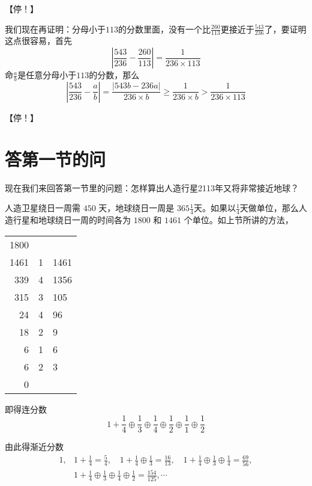 \documentclass{ctexart}
\newcommand{\cplus}{\oplus}
\begin{document}
【停！】

我们现在再证明：分母小于$113$的分数里面，没有一个比$\frac{260}{113}$更接近于$\frac{543}{236}$了，要证明这点很容易，首先
\begin{equation*}
\left|\frac{543}{236} - \frac{260}{113}\right| = \frac{1}{236\times113}
\end{equation*}
命$\frac{a}{b}$是任意分母小于$113$的分数，那么
\begin{equation*}
\left|\frac{543}{236} - \frac{a}{b}\right| = \frac{|543b - 236a|}{236\times b} \ge \frac{1}{236\times b} > \frac{1}{236\times113}
\end{equation*}

【停！】

\section{答第一节的问}
现在我们来回答第一节里的问题：怎样算出人造行星2113年又将非常接近地球？

人造卫星绕日一周需 $450$ 天，地球绕日一周是 $365 \frac{1}{4}$天。如果以$\frac{1}{4}$天做单位，那么人造行星和地球绕日一周的时间各为 $1800$ 和 $1461$ 个单位。如上节所讲的方法，
\begin{table}[h]
  \centering
\begin{tabular}{r|l|l}
1800 &   &      \\
1461 & 1 & 1461 \\ \cline{1-1}
339  & 4 & 1356 \\ \cline{3-3} 
315  & 3 & 105  \\ \cline{1-1}
24   & 4 & 96   \\ \cline{3-3} 
18   & 2 & 9    \\ \cline{1-1}
6    & 1 & 6    \\ \cline{3-3} 
6    & 2 & 3    \\ \cline{1-1}
0    &   &     
\end{tabular}
\end{table}

即得连分数
\begin{equation*}
1 + \frac{1}{4} \cplus \frac{1}{3} \cplus \frac{1}{4} \cplus \frac{1}{2} \cplus \frac{1}{1} \cplus \frac{1}{2}
\end{equation*}

由此得渐近分数
\begin{align*}
  1, & 1 + \frac{1}{4} = \frac{5}{4}, \quad 1 + \frac{1}{4} \cplus \frac{1}{3} = \frac{16}{13}, \quad 1 + \frac{1}{4} \cplus  \frac{1}{3} \cplus \frac{1}{4} = \frac{69}{56},\\
  & 1 + \frac{1}{4} \cplus  \frac{1}{3} \cplus  \frac{1}{4} \cplus  \frac{1}{2} = \frac{154}{125}, \cdots
\end{align*}
\end{document}
